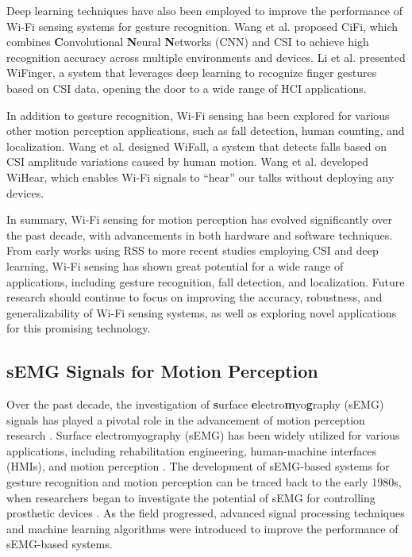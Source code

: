 \documentclass[12pt, a4paper]{article}
\begin{document}
Deep learning techniques have also been employed to improve the performance of Wi-Fi sensing systems for gesture recognition. Wang et al. \cite{wang2017cifi} proposed CiFi, which combines \textbf{C}onvolutional \textbf{N}eural \textbf{N}etworks (CNN) and CSI to achieve high recognition accuracy across multiple environments and devices. Li et al. \cite{li2016wifinger} presented WiFinger, a system that leverages deep learning to recognize finger gestures based on CSI data, opening the door to a wide range of HCI applications.

In addition to gesture recognition, Wi-Fi sensing has been explored for various other motion perception applications, such as fall detection, human counting, and localization. Wang et al. \cite{wang2016wifall} designed WiFall, a system that detects falls based on CSI amplitude variations caused by human motion. Wang et al. \cite{wang2014wihear} developed WiHear, which enables Wi-Fi signals to “hear” our talks without deploying any devices.

In summary, Wi-Fi sensing for motion perception has evolved significantly over the past decade, with advancements in both hardware and software techniques. From early works using RSS to more recent studies employing CSI and deep learning, Wi-Fi sensing has shown great potential for a wide range of applications, including gesture recognition, fall detection, and localization. Future research should continue to focus on improving the accuracy, robustness, and generalizability of Wi-Fi sensing systems, as well as exploring novel applications for this promising technology.

\subsection{sEMG Signals for Motion Perception}
Over the past decade, the investigation of \textbf{s}urface \textbf{e}lectro\textbf{m}yo\textbf{g}raphy (sEMG) signals has played a pivotal role in the advancement of motion perception research \cite{Kyeong2022}. Surface electromyography (sEMG) has been widely utilized for various applications, including rehabilitation engineering, human-machine interfaces (HMIs), and motion perception \cite{phinyomark2012feature, ortiz2014osseointegrated}. The development of sEMG-based systems for gesture recognition and motion perception can be traced back to the early 1980s, when researchers began to investigate the potential of sEMG for controlling prosthetic devices \cite{parker2006myoelectric}. As the field progressed, advanced signal processing techniques and machine learning algorithms were introduced to improve the performance of sEMG-based systems.
\end{document}
